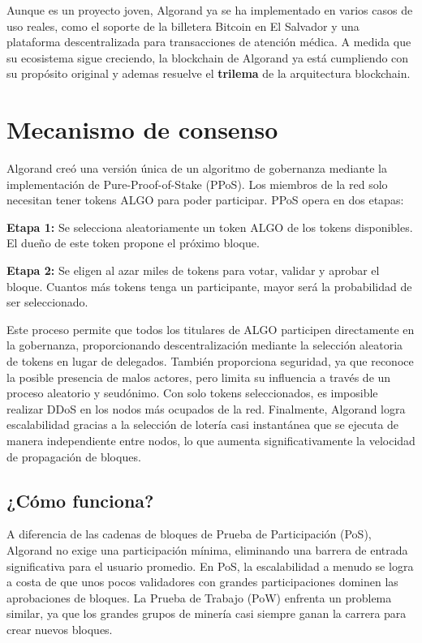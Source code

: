 \documentclass{article}
\begin{document}
Aunque es un proyecto joven, Algorand ya se ha implementado en varios casos de uso reales, como el soporte de la billetera Bitcoin en El Salvador y una plataforma descentralizada para transacciones de atención médica. A medida que su ecosistema sigue creciendo, la blockchain de Algorand ya está cumpliendo con su propósito original y ademas resuelve el \textbf{trilema} de la arquitectura blockchain.


\section{Mecanismo de consenso}

Algorand creó una versión única de un algoritmo de gobernanza mediante la implementación de Pure-Proof-of-Stake (PPoS). Los miembros de la red solo necesitan tener tokens ALGO para poder participar. PPoS opera en dos etapas:

\textbf{Etapa 1:} Se selecciona aleatoriamente un token ALGO de los tokens disponibles. El dueño de este token propone el próximo bloque.

\textbf{Etapa 2:} Se eligen al azar miles de tokens para votar, validar y aprobar el bloque. Cuantos más tokens tenga un participante, mayor será la probabilidad de ser seleccionado.

Este proceso permite que todos los titulares de ALGO participen directamente en la gobernanza, proporcionando descentralización mediante la selección aleatoria de tokens en lugar de delegados. También proporciona seguridad, ya que reconoce la posible presencia de malos actores, pero limita su influencia a través de un proceso aleatorio y seudónimo. Con solo tokens seleccionados, es imposible realizar DDoS en los nodos más ocupados de la red. Finalmente, Algorand logra escalabilidad gracias a la selección de lotería casi instantánea que se ejecuta de manera independiente entre nodos, lo que aumenta significativamente la velocidad de propagación de bloques.


\subsection{¿Cómo funciona?}

A diferencia de las cadenas de bloques de Prueba de Participación (PoS), Algorand no exige una participación mínima, eliminando una barrera de entrada significativa para el usuario promedio. En PoS, la escalabilidad a menudo se logra a costa de que unos pocos validadores con grandes participaciones dominen las aprobaciones de bloques. La Prueba de Trabajo (PoW) enfrenta un problema similar, ya que los grandes grupos de minería casi siempre ganan la carrera para crear nuevos bloques.
\end{document}

